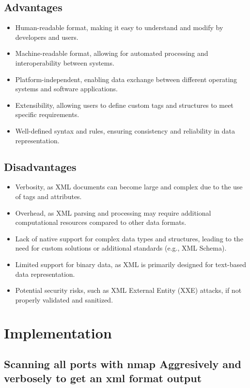 \documentclass[11pt]{article}
\begin{document}
\subsection{Advantages}
\begin{itemize}
    \item Human-readable format, making it easy to understand and modify by developers and users.
    \item Machine-readable format, allowing for automated processing and interoperability between systems.
    \item Platform-independent, enabling data exchange between different operating systems and software applications.
    \item Extensibility, allowing users to define custom tags and structures to meet specific requirements.
    \item Well-defined syntax and rules, ensuring consistency and reliability in data representation.
\end{itemize}

\subsection{Disadvantages}
\begin{itemize}
    \item Verbosity, as XML documents can become large and complex due to the use of tags and attributes.
    \item Overhead, as XML parsing and processing may require additional computational resources compared to other data formats.
    \item Lack of native support for complex data types and structures, leading to the need for custom solutions or additional standards (e.g., XML Schema).
    \item Limited support for binary data, as XML is primarily designed for text-based data representation.
    \item Potential security risks, such as XML External Entity (XXE) attacks, if not properly validated and sanitized.
\end{itemize}


\section{Implementation}

\subsection{Scanning all ports with nmap  Aggresively and verbosely to get an xml format output}
\end{document}
